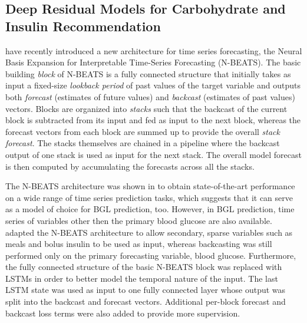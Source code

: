 \documentclass[journal,article,submit,moreauthors,pdftex]{Definitions/mdpi}
\begin{document}
\subsection{Deep Residual Models for Carbohydrate and Insulin Recommendation}
\label{sec:nbeats}

\citet{oreshkin:nbeats} have recently introduced a new architecture for time series forecasting, the Neural Basis Expansion for Interpretable Time-Series Forecasting (N-BEATS). The basic building {\it block} of N-BEATS is a fully connected structure that initially takes as input a fixed-size {\it lookback period} of past values of the target variable and outputs both {\it forecast} (estimates of future values) and {\it backcast} (estimates of past values) vectors. Blocks are organized into {\it stacks} such that the backcast of the current block is subtracted from its input and fed as input to the next block, whereas the forecast vectors from each block are summed up to provide the overall {\it stack forecast}. The stacks themselves are chained in a pipeline where the backcast output of one stack is used as input for the next stack. The overall model forecast is then computed by accumulating the forecasts across all the stacks.

The N-BEATS architecture was shown in \cite{oreshkin:nbeats} to obtain state-of-the-art performance on a wide range of time series prediction tasks, which suggests that it can serve as a model of choice for BGL prediction, too. However, in BGL prediction, time series of variables other then the primary blood glucose are also available. \citet{rubin_falcone:nbeats_bgl} adapted the N-BEATS architecture to allow secondary, sparse variables such as meals and bolus insulin to be used as input, whereas backcasting was still performed only on the primary forecasting variable, blood glucose. Furthermore, the fully connected structure of the basic N-BEATS block was replaced with LSTMs in order to better model the temporal nature of the input. The last LSTM state was used as input to one fully connected layer whose output was split into the backcast and forecast vectors. Additional per-block forecast and backcast loss terms were also added to provide more supervision.
\end{document}
